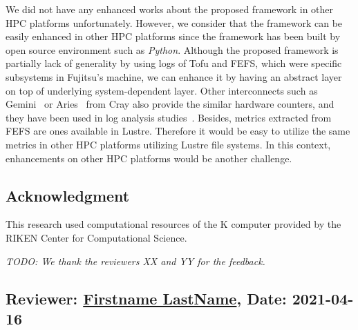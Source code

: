 \documentclass{jhps}
\begin{document}
We did not have any enhanced works about the proposed framework
in other HPC platforms unfortunately.
However, we consider that the framework can be easily enhanced
in other HPC platforms since the framework has been built
by open source environment such as {\itshape Python}.
Although the proposed framework is partially lack of generality
by using logs of Tofu and FEFS, which were specific subsystems in Fujitsu's machine,
we can enhance it by having an abstract layer
on top of underlying system-dependent layer.
Other interconnects such as Gemini~\cite{alverson:hoti10,pedretti:cug13} or
Aries~\cite{cray:aries_overview,cray:aries_hardware_counters}
from Cray also provide the similar hardware counters,
and they have been used in
log analysis studies~\cite{chunduri:pmbs19,ahlgren:cug18,zimmer:cug16,pedretti:cug13}.
Besides, metrics extracted from FEFS are ones available in Lustre.
Therefore it would be easy to utilize the same metrics in
other HPC platforms utilizing Lustre file systems.
In this context, enhancements on other HPC platforms would be
another challenge.

\subsection*{Acknowledgment}

This research used computational resources of the K computer
provided by the RIKEN Center for Computational Science.

\textit{TODO: We thank the reviewers XX and YY for the feedback.}



\reviews   %

\subsection*{Reviewer: \href{Optional URL to reviewer page}{Firstname LastName}, Date: 2021-04-16}
\end{document}
